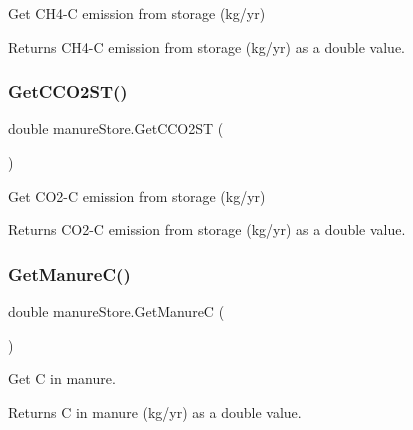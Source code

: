Get C\+H4-\/C emission from storage (kg/yr) 

\begin{DoxyReturn}{Returns}
C\+H4-\/C emission from storage (kg/yr) as a double value. 
\end{DoxyReturn}
\mbox{\label{classmanure_store_a33e4a1b2f4613fcfaa3b6f874acab8b4}} 
\subsubsection{\texorpdfstring{GetCCO2ST()}{GetCCO2ST()}}
{\footnotesize\ttfamily double manure\+Store.\+Get\+C\+C\+O2\+ST (\begin{DoxyParamCaption}{ }\end{DoxyParamCaption})\hspace{0.3cm}{\ttfamily [inline]}}



Get C\+O2-\/C emission from storage (kg/yr) 

\begin{DoxyReturn}{Returns}
C\+O2-\/C emission from storage (kg/yr) as a double value. 
\end{DoxyReturn}
\mbox{\label{classmanure_store_afb0124e830306d9f1bb66b11fc6df6b0}} 
\subsubsection{\texorpdfstring{GetManureC()}{GetManureC()}}
{\footnotesize\ttfamily double manure\+Store.\+Get\+ManureC (\begin{DoxyParamCaption}{ }\end{DoxyParamCaption})\hspace{0.3cm}{\ttfamily [inline]}}



Get C in manure. 

\begin{DoxyReturn}{Returns}
C in manure (kg/yr) as a double value. 
\end{DoxyReturn}
\mbox{\label{classmanure_store_a8013be8424d3ea1875bab33f4ca48089}} 
